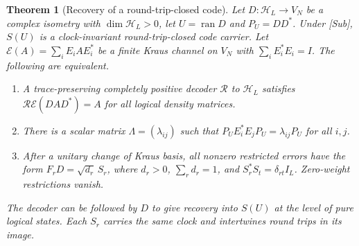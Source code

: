 \documentclass[aps,pra,onecolumn,superscriptaddress,nofootinbib,10pt]{revtex4-2}
\newtheorem{theorem}{Theorem}
\theoremstyle{definition}
\theoremstyle{remark}
\begin{document}
\begin{theorem}[Recovery of a round-trip-closed code]\label{cp:kl}
Let $D:\mathcal H_L\to V_N$ be a complex isometry with $\dim\mathcal H_L>0$, let $U=\operatorname{ran}D$ and $P_U=DD^*$. Under [Sub], $S(U)$ is a clock-invariant round-trip-closed code carrier. Let $\mathcal E(A)=\sum_i E_i A E_i^*$ be a finite Kraus channel on $V_N$ with $\sum_i E_i^*E_i=I$. The following are equivalent.
\begin{enumerate}
\item A trace-preserving completely positive decoder $\mathcal R$ to $\mathcal H_L$ satisfies $\mathcal R\mathcal E(DAD^*)=A$ for all logical density matrices.
\item There is a scalar matrix $\Lambda=(\lambda_{ij})$ such that $P_UE_i^*E_jP_U=\lambda_{ij}P_U$ for all $i,j$.
\item After a unitary change of Kraus basis, all nonzero restricted errors have the form $F_rD=\sqrt{d_r}\,S_r$, where $d_r>0$, $\sum_r d_r=1$, and $S_r^*S_t=\delta_{rt}I_L$. Zero-weight restrictions vanish.
\end{enumerate}
The decoder can be followed by $D$ to give recovery into $S(U)$ at the level of pure logical states. Each $S_r$ carries the same clock and intertwines round trips in its image.
\end{theorem}
\end{document}
